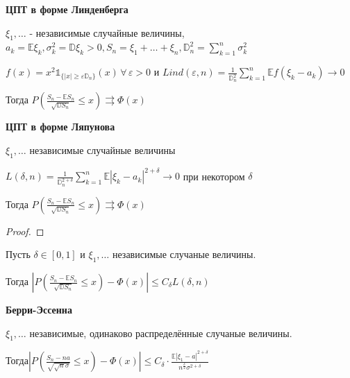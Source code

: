 \begin{theorem}
    \textbf{ЦПТ в форме Линденберга}

    $\xi_1, \ldots$ - независимые случайные величины, $a_k = \mathbb{E} \xi_k, \sigma_k^2 = \mathbb{D} \xi_k > 0, S_n = \xi_1 + \ldots + \xi_n, \mathbb{D}_n^2 = \sum_{k = 1}^n \sigma_k^2$

    $f(x) = x^2 \mathds{1}_{\{ |x| \geqslant \varepsilon \mathbb{D}_n \} } (x) \, \forall \, \varepsilon > 0$ и $Lind (\varepsilon, n) = \frac{1}{\mathbb{D}_n^2} \sum_{k = 1}^n \mathbb{E} f (\xi_k - a_k) \rightarrow 0$

    Тогда $P \left( \frac{S_n - \mathbb{E} S_n}{\sqrt{\mathbb{D} S_n}} \leqslant x \right) \rightrightarrows \Phi (x)$
\end{theorem}

\begin{theorem}
    \textbf{ЦПТ в форме Ляпунова}

    $\xi_1, \ldots$ независимые случайные величины

    $L(\delta, n) = \frac{1}{\mathbb{D}_n^{2 + \delta}} \sum_{k = 1}^n \mathbb{E} | \xi_k - a_k |^{2 + \delta} \rightarrow 0$ при некотором $\delta$

    Тогда $P\left( \frac{S_n - \mathbb{E} S_n}{\sqrt{\mathbb{D} S_n}} \leqslant x \right) \rightrightarrows \Phi (x)$
\end{theorem}

\begin{proof}
\end{proof}

\begin{theorem}
    Пусть $\delta \in [0, 1]$ и $\xi_1, \ldots$ независимые случаные величины.

    Тогда $\left | P \left( \frac{S_n - \mathbb{E} S_n}{\sqrt{\mathbb{D} S_n}} \leqslant x \right) - \Phi (x) \right | \leqslant C_{\delta} L (\delta, n)$
\end{theorem}

\begin{theorem}
    \textbf{Берри-Эссенна}

    $\xi_1, \ldots$ независимые, одинаково распределённые случаные величины.

    Тогда$\left | P \left( \frac{S_n - na}{\sqrt{\sqrt{n} \sigma}} \leqslant x \right) - \Phi (x) \right | \leqslant C_{\delta} \cdot \frac{\mathbb{E} |\xi_1 - a|^{2 + \delta}}{n^{\frac{\delta}{2}} \sigma^{2 + \delta}}$
\end{theorem}

